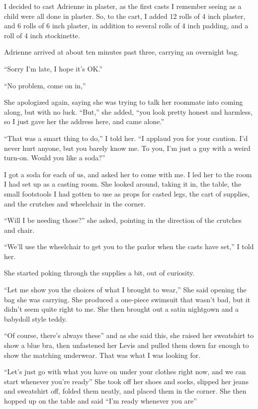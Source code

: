 I decided to cast Adrienne in plaster, as the first casts I remember seeing as a child were
all done in plaster. So, to the cart, I added 12 rolls of 4 inch plaster, and 6 rolls of 6 inch
plaster, in addition to several rolls of 4 inch padding, and a roll of 4 inch stockinette.

Adrienne arrived at about ten minutes past three, carrying an overnight bag.

``Sorry I'm late, I hope it's OK.''

``No problem, come on in,''

She apologized again, saying she was trying to talk her roommate into coming along, but with
no luck. ``But,'' she added, ``you look pretty honest and harmless, so I just gave her the
address here, and came alone.''

``That was a smart thing to do,'' I told her. ``I applaud you for your caution. I'd never
hurt anyone, but you barely know me. To you, I'm just a guy with a weird turn-on. Would you like
a soda?''

I got a soda for each of us, and asked her to come with me. I led her to the room I had set
up as a casting room. She looked around, taking it in, the table, the small footstools I had
gotten to use as props for casted legs, the cart of supplies, and the crutches and wheelchair in
the corner.

``Will I be needing those?'' she asked, pointing in the direction of the crutches and chair.

``We'll use the wheelchair to get you to the parlor when the casts have set,'' I told her.

She started poking through the supplies a bit, out of curiosity.

``Let me show you the choices of what I brought to wear,'' She said opening the bag she was
carrying. She produced a one-piece swimsuit that wasn't bad, but it didn't seem quite right to
me. She then brought out a satin nightgown and a babydoll style teddy.

``Of course, there's always these'' and as she said this, she raised her sweatshirt to show
a blue bra, then unfastened her Levis and pulled them down far enough to show the matching
underwear. That was what I was looking for.

``Let's just go with what you have on under your clothes right now, and we can start
whenever you're ready'' She took off her shoes and socks, slipped her jeans and sweatshirt off,
folded them neatly, and placed them in the corner. She then hopped up on the table and said
``I'm ready whenever you are''

